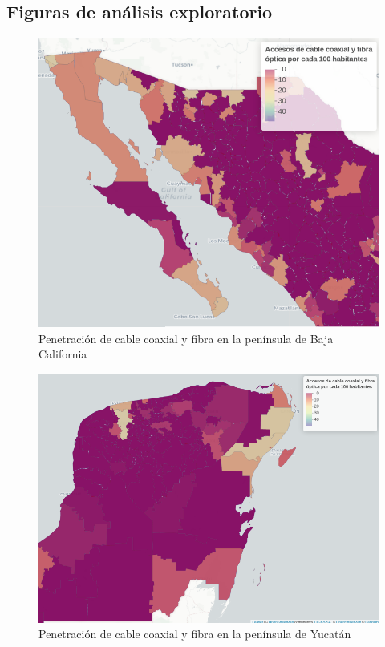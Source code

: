 \documentclass[9pt,twocolumn,twoside]{ilcss}
\begin{document}
\begin{Apendices}
	\section{Figuras de análisis exploratorio}

\begin{figure}[tbhp]
	\centering
	\includegraphics[width=0.9\linewidth]{images/pen_habs_penbc.png}
	\caption{Penetración de cable coaxial y fibra en la península de Baja California}
	\label{fig:pen_habs_penbc}
\end{figure}

\begin{figure}[tbhp]
	\centering
	\includegraphics[width=0.9\linewidth]{images/pen_habs_penyuc.png}
	\caption{Penetración de cable coaxial y fibra en la península de Yucatán}
	\label{fig:pen_habs_penyuc}
\end{figure}


\end{Apendices}
\end{document}
